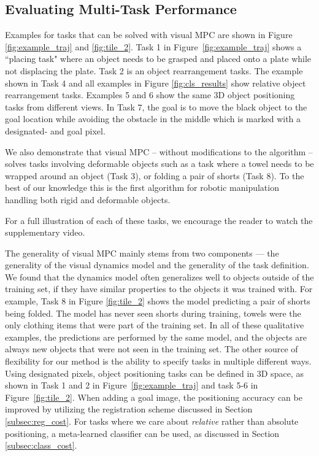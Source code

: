 \subsection{Evaluating Multi-Task Performance}
\label{subsec:multi_task_bench}
Examples for tasks that can be solved with visual MPC are shown in Figure \ref{fig:example_traj} and \ref{fig:tile_2}. Task 1 in Figure~\ref{fig:example_traj} shows a ``placing task" where an object needs to be grasped and placed onto a plate while not displacing the plate. Task 2 is an object rearrangement tasks. The example shown in Task 4 and all examples in Figure \ref{fig:cls_results} show relative object rearrangement tasks. Examples 5 and 6 show the same 3D object positioning tasks from different views. In Task 7, the goal is to move the black object to the goal location while avoiding the obstacle in the middle which is marked with a designated- and goal pixel. 

We also demonstrate that visual MPC -- without modifications to the algorithm -- solves tasks involving deformable objects such as a task where a towel needs to be wrapped around an object (Task 3), or folding a pair of shorts (Task 8). To the best of our knowledge this is the first algorithm for robotic manipulation handling both rigid and deformable objects.

For a full illustration of each of these tasks, we encourage the reader to watch the supplementary video.

The generality of visual MPC mainly stems from two components --- the generality of the visual dynamics model and the generality of the task definition.
We found that the dynamics model often generalizes well to objects outside of the training set, if they have similar properties to the objects it was trained with. For example, Task 8 in Figure \ref{fig:tile_2} shows the model predicting a pair of shorts being folded. The model has never seen shorts during training, towels were the only clothing items that were part of the training set. In all of these qualitative examples, the predictions are performed by the same model, and the objects are always new objects that were not seen in the training set.
The other source of flexibility for our method is the ability to specify tasks in multiple different ways. Using designated pixels, object positioning tasks can be defined in 3D space, as shown in Task 1 and 2 in Figure~\ref{fig:example_traj} and task 5-6 in Figure~\ref{fig:tile_2}. When adding a goal image, the positioning accuracy can be improved by utilizing the registration scheme discussed in Section \ref{subsec:reg_cost}.
For tasks where we care about \emph{relative} rather than absolute positioning, a meta-learned classifier can be used, as discussed in Section \ref{subsec:class_cost}.

